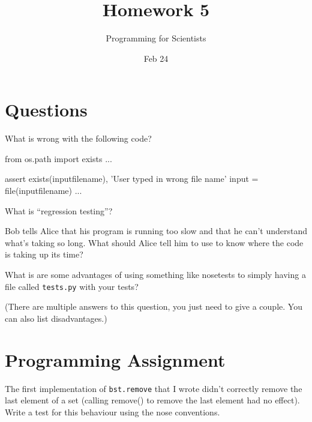 
\author{Programming for Scientists}
\title{Homework 5}
\date{Feb 24}

\maketitle

\chapter{Questions}

\question %
What is wrong with the following code?

\begin{python}
from os.path import exists
...

assert exists(inputfilename), 'User typed in wrong file name'
input = file(inputfilename)
...
\end{python}

\question %
What is ``regression testing''?

\question %
Bob tells Alice that his program is running too slow and that he can't understand what's taking so long. What should Alice tell him to use to know where the code is taking up its time?

\question %
What is are some advantages of using something like nosetests to simply having a file called \texttt{tests.py} with your tests?

(There are multiple answers to this question, you just need to give a couple. You can also list disadvantages.)


\chapter{Programming Assignment}
The first implementation of \texttt{bst.remove} that I wrote didn't correctly remove the last element of a set (calling remove() to remove the last element had no effect). Write a test for this behaviour using the nose conventions.


